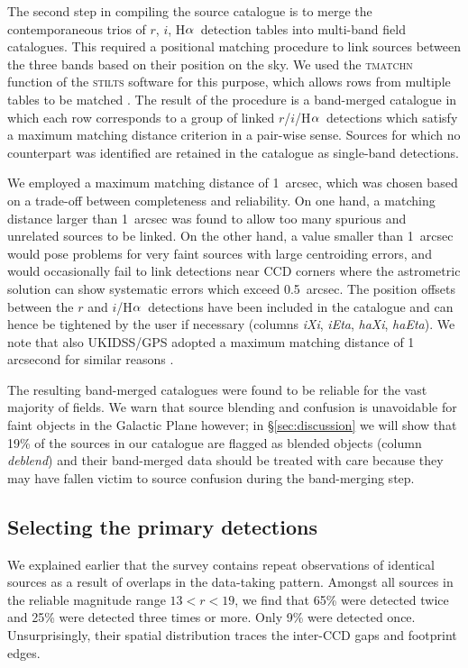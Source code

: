 \documentclass[useAMS,usenatbib]{mn2e}
\def\ha{\mbox{H$\rm \alpha$}}
\begin{document}
The second step in compiling the source catalogue
is to merge the contemporaneous trios
of $r$, $i$, \ha\ detection tables
into multi-band field catalogues.
This required a positional matching procedure 
to link sources between the three bands
based on their position on the sky.
We used the \textsc{tmatchn} function 
of the \textsc{stilts} software for this purpose,
which allows rows from multiple tables to be matched \citep{Taylor2006}.
The result of the procedure is a band-merged catalogue
in which each row corresponds to a group of linked $r$/$i$/\ha\ detections
which satisfy a maximum matching distance criterion in a pair-wise sense.
Sources for which no counterpart was identified
are retained in the catalogue as single-band detections.

We employed a maximum matching distance of 1~arcsec,
which was chosen based on a trade-off between 
completeness and reliability.
On one hand, a matching distance larger than 1~arcsec 
was found to allow too many spurious and unrelated sources 
to be linked. 
On the other hand, a value smaller than 1~arcsec 
would pose problems for very faint sources 
with large centroiding errors, 
and would occasionally fail to link detections near CCD corners
where the astrometric solution can 
show systematic errors which exceed 0.5~arcsec.
The position offsets between the $r$ and $i$/\ha\ detections
have been included in the catalogue 
and can hence be tightened by the user if necessary
(columns \emph{iXi}, \emph{iEta}, \emph{haXi}, \emph{haEta}).
We note that also UKIDSS/GPS adopted 
a maximum matching distance of 1 arcsecond 
for similar reasons \citep{Hambly2008}.

The resulting band-merged catalogues were found
to be reliable for the vast majority of fields.
We warn that source blending and confusion is unavoidable
for faint objects in the Galactic Plane however;
in \S\ref{sec:discussion} we will show
that 19\% of the sources in our catalogue
are flagged as blended objects (column \emph{deblend})
and their band-merged data should be treated with care
because they may have fallen victim to source confusion
during the band-merging step.

\subsection{Selecting the primary detections}

We explained earlier that the survey contains repeat observations
of identical sources as a result of overlaps in the data-taking pattern.
Amongst all sources in the reliable magnitude range $13<r<19$,
we find that 65\% were detected twice and 25\% were detected three times or more.
Only 9\% were detected once.
Unsurprisingly, their spatial distribution traces
the inter-CCD gaps and footprint edges.
\end{document}

